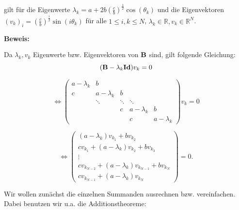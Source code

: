 gilt für die Eigenwerte $\lambda_{k} = a + 2b\left(\frac{c}{b}\right)^{\frac{1}{2}} \cos(\theta_{k})$ und die Eigenvektoren\\
$(v_{k})_{i} = \left(\frac{c}{b}\right)^{\frac{i}{2}} \sin(i \theta_{k})$ für alle $1 \le i,k \le N$, $\lambda_{k} \in \mathbb{R}, v_{k} \in \mathbb{R}^{N}$.

\textbf{Beweis:}

Da $\lambda_{k}, v_{k}$ Eigenwerte bzw. Eigenvektoren von ${\textbf{B}}$ sind, gilt folgende Gleichung:
\begin{equation}
({\textbf{B}} - \lambda_{k} {\textbf{Id}}) v_{k} = 0
\end{equation}

\begin{equation}
\Longleftrightarrow
\begin{pmatrix}
a - \lambda_{k} & b\\
c & a - \lambda_{k} & b\\
  & \ddots & \ddots & \ddots\\
  &		   & c & a - \lambda_{k} & b\\
  &		   &  & c & a - \lambda_{k}
\end{pmatrix}
v_{k} = 0
\end{equation}

\begin{equation}
\Longleftrightarrow
\begin{pmatrix}
(a - \lambda_{k}) v_{k_{1}} + b v_{k_{2}}\\
c v_{k_{1}} + (a - \lambda_{k}) v_{k_{2}} + b v_{k_{3}}\\
\vdots\\
c v_{k_{N-2}} + (a - \lambda_{k}) v_{k_{N-1}} + b v_{k_{N}}\\
c v_{k_{N-1}} + (a - \lambda_{k}) v_{k_{N}}
\end{pmatrix}
= 0.
\end{equation}

Wir wollen zunächst die einzelnen Summanden ausrechnen bzw. vereinfachen. Dabei benutzen wir u.a. die Additionstheoreme:

